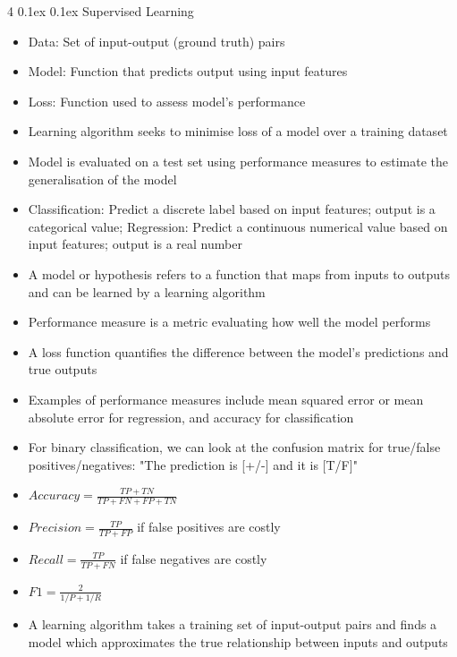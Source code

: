 \documentclass[10pt, landscape]{article}
\makeatletter
\renewcommand{\subsection}{\@startsection{subsection}{2}{0mm}%
  {0.1ex} %
  {0.1ex} %
  {\normalfont\normalsize\bfseries}}
\makeatother
\begin{document}
\begin{multicols*}{4}
\subsection{Supervised Learning}
\begin{itemize}
    \item Data: Set of input-output (ground truth) pairs
    \item Model: Function that predicts output using input features
    \item Loss: Function used to assess model's performance
    \item Learning algorithm seeks to minimise loss of a model over a training dataset
    \item Model is evaluated on a test set using performance measures to estimate the generalisation of the model
    \item Classification: Predict a discrete label based on input features; output is a categorical value; Regression: Predict a continuous numerical value based on input features; output is a real number
    \item A model or hypothesis refers to a function that maps from inputs to outputs and can be learned by a learning algorithm
    \item Performance measure is a metric evaluating how well the model performs
    \item A loss function quantifies the difference between the model's predictions and true outputs
    \item Examples of performance measures include mean squared error or mean absolute error for regression, and accuracy for classification
    \item For binary classification, we can look at the confusion matrix for true/false positives/negatives: "The prediction is [+/-] and it is [T/F]"
    \item $Accuracy=\frac{TP+TN}{TP+FN+FP+TN}$
    \item $Precision=\frac{TP}{TP+FP}$ if false positives are costly
    \item $Recall=\frac{TP}{TP+FN}$ if false negatives are costly
    \item $F1=\frac{2}{1/P+1/R}$
    \item A learning algorithm takes a training set of input-output pairs and finds a model which approximates the true relationship between inputs and outputs
\end{itemize}


\end{multicols*}
\end{document}
